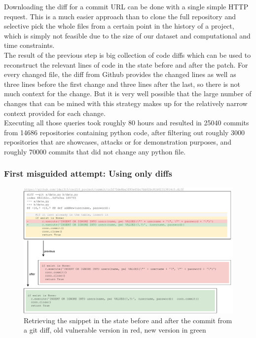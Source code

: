 \documentclass[
a4paper,
pagesize,
pdftex,
12pt,
twoside, %
BCOR=5mm, %
ngerman,
fleqn,
final,
]{scrartcl}
\begin{document}
	Downloading the diff for a commit URL can be done with a single simple HTTP request. This is a much easier approach than to clone the full repository and selective pick the whole files from a certain point in the history of a project, which is simply not feasible due to the size of our dataset and computational and time constraints. \\
	The result of the previous step is big collection of code diffs which can be used to reconstruct the relevant lines of code in the state before and after the patch. For every changed file, the diff from Github provides the changed lines as well as three lines before the first change and three lines after the last, so there is not much context for the change. 
	But it is very well possible that the large number of changes that can be mined with this strategy makes up for the relatively narrow context provided for each change.\\
	Executing all those queries took roughly 80 hours and resulted in 25040 commits from 14686 repositories containing python code, after filtering out roughly 3000 repositories that are showcases, attacks or for demonstration purposes, and roughly 70000 commits that did not change any python file.	
	
	\subsubsection{First misguided attempt: Using only diffs}
	
	\begin{figure}[ht]
		\centering
		\includegraphics[width=\linewidth]{img/GitCommitPreviousAfter}
		\caption{Retrieving the snippet in the state before and after the commit from a git diff, old vulnerable version in red, new version in green}
		\label{fig:gitdiff}
	\end{figure}
	
\end{document}

